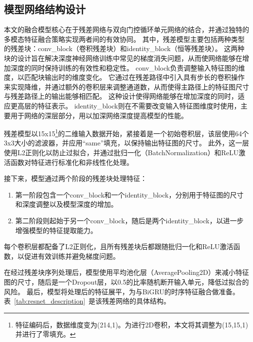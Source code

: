 \subsection{模型网络结构设计}
本文的融合模型核心在于残差网络与双向门控循环单元网络的结合，并通过独特的多模态特征融合策略实现两者间的有效协同。
其中，残差模型主要包括两种类型的残差块：conv\_block（卷积残差块）和identity\_block（恒等残差块）。
这两种块的设计旨在解决深度神经网络训练中常见的梯度消失问题，从而使网络能够在增加深度的同时保持训练的有效性和稳定性。
conv\_block负责调整输入特征图的维度，以匹配块输出时的维度变化。
它通过在残差路径中引入具有步长的卷积操作来实现降维，并通过额外的卷积层来调整通道数，从而使得主路径上的特征图尺寸与残差路径上的输出能够相匹配。
这种设计使得网络能够在增加深度的同时，适应更高层的特征表示。
identity\_block则在不需要改变输入特征图维度时使用，主要用于网络的深层部分，用以加深网络深度提高模型的性能。\par

残差模型以15x15\footnote{特征编码后，数据维度变为(214,1)。为进行2D卷积，本文将其调整为(15,15,1)并进行了零填充。}的二维输入数据开始，紧接着是一个初始卷积层，该层使用64个3x3大小的滤波器，并应用“same”填充，以保持输出特征图的尺寸。
此外，这一层使用L2正则化以防止过拟合，并通过批归一化（BatchNormalization）和ReLU激活函数对特征进行标准化和非线性化处理。

接下来，模型通过两个阶段的残差块处理特征：

\begin{enumerate}[label=\arabic*)]
	\item 第一阶段包含一个conv\_block和一个identity\_block，分别用于特征图的尺寸和深度调整以及模型深度的增加。
	\item 第二阶段则起始于另一个conv\_block，随后是两个identity\_block，以进一步增强模型的特征提取能力。
\end{enumerate}
每个卷积层都配备了L2正则化，且所有残差块后都跟随批归一化和ReLU激活函数，以促进有效训练并避免梯度问题。

在经过残差块序列处理后，模型使用平均池化层（AveragePooling2D）来减小特征图的尺寸，随后是一个Dropout层，以0.5的比率随机断开输入单元，降低过拟合的风险。
最后，模型将处理后的特征展平，为与BiGRU的时序特征融合做准备。表~\ref{tab:resnet_description}~是该残差网络的具体结构。


